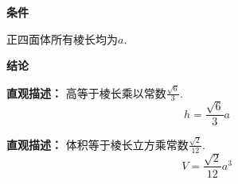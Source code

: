 \begin{statementbox}
	\textbf{\textcolor{CStatement}{条件}}
	\begin{description}[style=nextline, leftmargin=2.8em, labelsep=0.5em, itemsep=0.35em]
		\item[\textbf{\textcolor{CStatement}{条件1（棱长相等）：}}]正四面体所有棱长均为$a$.
	\end{description}

	\textbf{\textcolor{CStatement}{结论}}
	\begin{description}[style=nextline, leftmargin=2.8em, labelsep=0.5em, itemsep=0.45em]
		\item[\textbf{\textcolor{CStatement}{结论一（高公式）：}}]
			\textbf{\textcolor{CStatement}{直观描述：}}
			高等于棱长乘以常数$\frac{\sqrt{6}}{3}$.
			\[
				h = \frac{\sqrt{6}}{3} a
			\]

		\item[\textbf{\textcolor{CStatement}{常见变形（体积公式）：}}]
			\textbf{\textcolor{CStatement}{直观描述：}}
			体积等于棱长立方乘常数$\frac{\sqrt{2}}{12}$.
			\[
				V = \frac{\sqrt{2}}{12} a^3
			\]
	\end{description}
\end{statementbox}
